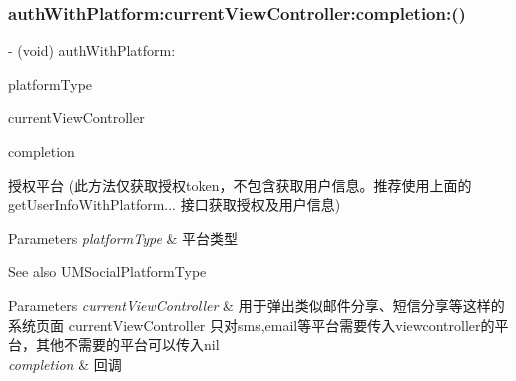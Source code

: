 \subsubsection{\texorpdfstring{auth\+With\+Platform\+:current\+View\+Controller\+:completion\+:()}{authWithPlatform:currentViewController:completion:()}\hspace{0.1cm}{\footnotesize\ttfamily [1/2]}}
{\footnotesize\ttfamily -\/ (void) auth\+With\+Platform\+: \begin{DoxyParamCaption}\item[{(U\+M\+Social\+Platform\+Type)}]{platform\+Type }\item[{currentViewController:(U\+I\+View\+Controller $\ast$)}]{current\+View\+Controller }\item[{completion:(U\+M\+Social\+Request\+Completion\+Handler)}]{completion }\end{DoxyParamCaption}}

授权平台 (此方法仅获取授权token，不包含获取用户信息。推荐使用上面的 get\+User\+Info\+With\+Platform... 接口获取授权及用户信息)


\begin{DoxyParams}{Parameters}
{\em platform\+Type} & 平台类型 \\
\hline
\end{DoxyParams}
\begin{DoxySeeAlso}{See also}
U\+M\+Social\+Platform\+Type 
\end{DoxySeeAlso}

\begin{DoxyParams}{Parameters}
{\em current\+View\+Controller} & 用于弹出类似邮件分享、短信分享等这样的系统页面  current\+View\+Controller 只对sms,email等平台需要传入viewcontroller的平台，其他不需要的平台可以传入nil \\
\hline
{\em completion} & 回调 \\
\hline
\end{DoxyParams}
\mbox{\label{interface_u_m_social_manager_ad5b73eb1c63bd9e2b62f2e01e079af61}} 

